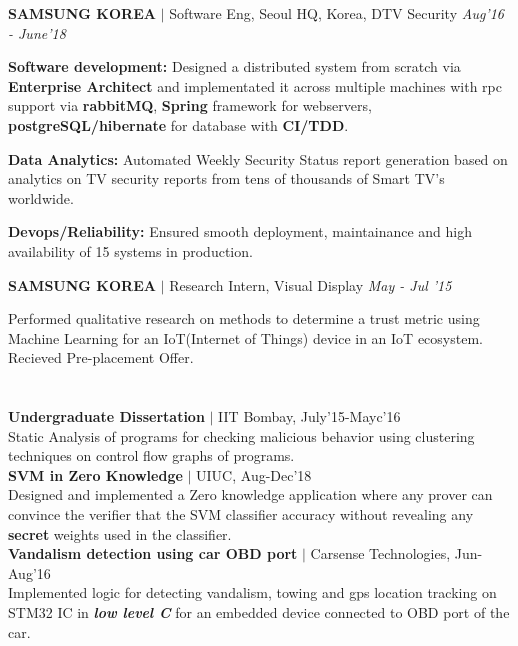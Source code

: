 \documentclass[margin,line]{resume}
\begin{document}
\begin{resume}
\textbf{SAMSUNG KOREA} $\mid$ Software Eng, Seoul HQ, Korea, DTV Security  
\hfill 
\textit{Aug'16 - June'18} \\
\vspace{-3.5mm}
\begin{list2}
    \item \textbf{Software development:} Designed a distributed system from scratch via \textbf{Enterprise Architect} and implementated it across multiple machines with rpc support via \textbf{rabbitMQ}, \textbf{Spring} framework for webservers, \textbf{postgreSQL/hibernate} for database with \textbf{CI/TDD}.   
    \vspace{1mm}
    \item \textbf{Data Analytics:} Automated Weekly Security Status report generation based on analytics on TV security reports from tens of thousands of Smart TV’s worldwide.
    \vspace{1mm}
    \item \textbf{Devops/Reliability:} Ensured smooth deployment, maintainance and high availability of 15 systems in production.
\end{list2}
\vspace{-3.5mm}
\textbf{SAMSUNG KOREA} $\mid$ Research Intern, Visual Display \hfill \textit{May - Jul '15} \\
\vspace{-3.5mm}
\begin{list2}
\item Performed qualitative research on methods to determine a trust metric using Machine Learning for an IoT(Internet of Things) device in an IoT ecosystem. Recieved Pre-placement Offer.
\end{list2}

\vspace{-2mm}
\section{}
\textbf{Undergraduate Dissertation} $\mid$ IIT Bombay, July'15-Mayc'16\\
Static Analysis of programs for checking malicious behavior using clustering techniques on control flow graphs of programs.\\
\textbf{SVM in Zero Knowledge} $\mid$ UIUC, Aug-Dec'18\\
Designed and implemented a Zero knowledge application where any prover can convince the verifier that the SVM classifier accuracy without revealing any \textbf{secret} weights used in the classifier. \vspace{1mm}\\ 
\textbf{Vandalism detection using car OBD port} $\mid$ Carsense Technologies, Jun-Aug'16 \\
Implemented logic for detecting vandalism, towing and gps location tracking on STM32 IC in \textbf{\textit{low level C}} for an embedded device connected to OBD port of the car. 
\vspace{-7mm} \\


\end{resume}
\end{document}
